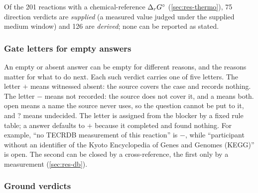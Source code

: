 Of the 201 reactions with a chemical-reference $\Delta_r G^\circ$ (\cref{sec:res-thermo}), 75 direction verdicts are \emph{supplied} (a measured value judged under the supplied medium window) and 126 are \emph{derived}; none can be reported as stated.

\subsubsection{Gate letters for empty answers}
\label{sec:gates}

An empty or absent answer can be empty for different reasons, and the reasons matter for what to do next.
Each such verdict carries one of five letters.
The letter $+$ means witnessed absent: the source covers the case and records nothing.
The letter $-$ means not recorded: the source does not cover it, and \textsf{a} means both.
\textsf{open} means a name the source never uses, so the question cannot be put to it, and \textsf{?} means undecided.
The letter is assigned from the blocker by a fixed rule table; a  answer defaults to $+$ because it completed and found nothing.
For example, ``no TECRDB measurement of this reaction'' is $-$, while ``participant without an identifier of the Kyoto Encyclopedia of Genes and Genomes (KEGG)'' is \textsf{open}.
The second can be closed by a cross-reference, the first only by a measurement (\cref{sec:res-db}).

\subsubsection{Ground verdicts}
\label{sec:ground}


